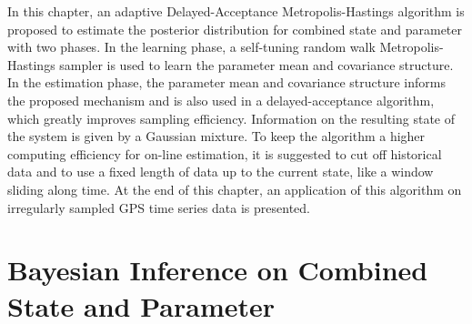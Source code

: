 In this chapter, an adaptive Delayed-Acceptance Metropolis-Hastings algorithm is proposed to estimate the posterior distribution for combined state and parameter with two phases. In the learning phase, a self-tuning random walk Metropolis-Hastings sampler is used to learn the parameter mean and covariance structure. In the estimation phase, the parameter mean and covariance structure informs the proposed mechanism and is also used in a delayed-acceptance algorithm, which greatly improves sampling efficiency. Information on the resulting state of the system is given by a Gaussian mixture. To keep the algorithm a higher computing efficiency for on-line estimation, it is suggested to cut off historical data and to use a fixed length of data up to the current state, like a window sliding along time. At the end of this chapter, an application of this algorithm on irregularly sampled GPS time series data is presented. 

%



\section{Bayesian Inference on Combined State and Parameter}

